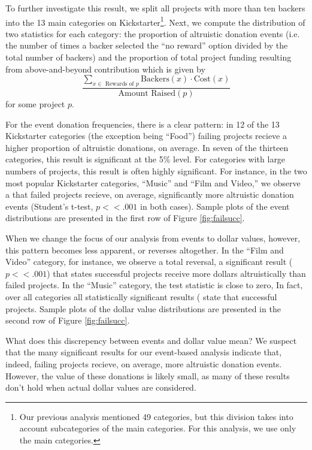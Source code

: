 \documentclass[letterpaper]{article}
\begin{document}
To further investigate this result, we split all projects with more than ten backers into the 13 main categories on Kickstarter\footnote{Our previous analysis mentioned 49 categories, but this division takes into account subcategories of the main categories. For this analysis, we use only the main categories.}. Next, we compute the distribution of two statistics for each category: the proportion of altruistic donation events (i.e. the number of times a backer selected the ``no reward'' option divided by the total number of backers) and the proportion of total project funding resulting from above-and-beyond contribution which is given by
\begin{equation} \label{eq:altruism}
\frac{\sum\limits_{x \in \text{ Rewards of $p$}} \text{Backers}(x) \cdot \text{Cost}(x)}
{\text{Amount Raised}(p)}
\end{equation}
for some project $p$.

For the event donation frequencies, there is a clear pattern: in 12 of the 13 Kickstarter categories (the exception being ``Food'') failing projects recieve a higher proportion of altruistic donations, on average. In seven of the thirteen categories, this result is significant at the 5\% level. For categories with large numbers of projects, this result is often highly significant. For instance, in the two most popular Kickstarter categories, ``Music'' and ``Film and Video,'' we observe a that failed projects recieve, on average, significantly more altruistic donation events (Student's t-test, $p<<.001$ in both cases). Sample plots of the event distributions are presented in the first row of Figure \ref{fig:failsucc}.

When we change the focus of our analysis from events to dollar values, however, this pattern becomes less apparent, or reverses altogether. In the ``Film and Video'' category, for instance, we observe a total reversal, a significant result ($p << .001$) that states successful projects receive more dollars altruistically than failed projects. In the ``Music'' category, the test statistic is close to zero,  In fact, over all categories all statistically significant results ( state that successful projects. Sample plots of the dollar value distributions are presented in the second row of Figure \ref{fig:failsucc}.

What does this discrepency between events and dollar value mean? We suspect that the many significant results for our event-based analysis indicate that, indeed, failing projects recieve, on average, more altruistic donation events. However, the value of these donations is likely small, as many of these results don't hold when actual dollar values are considered.
\end{document}
